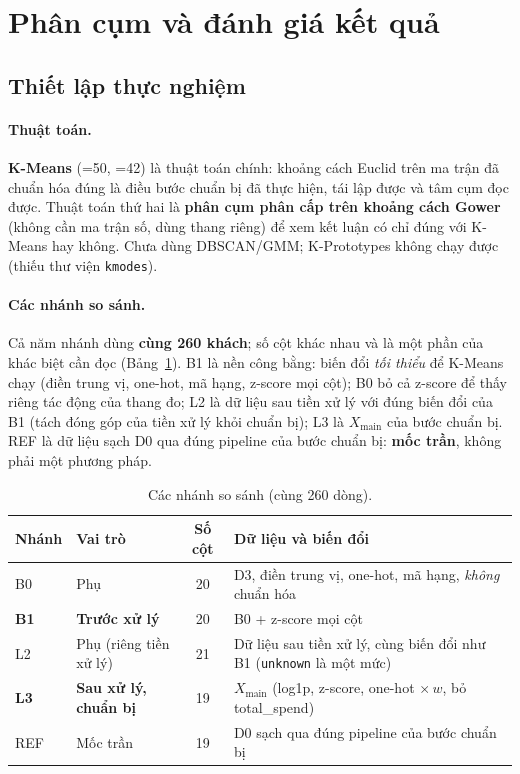 \section{Phân cụm và đánh giá kết quả}
\label{sec:e}

\subsection{Thiết lập thực nghiệm}
\paragraph{Thuật toán.} \textbf{K-Means} (=50, =42) là thuật toán chính: khoảng cách Euclid trên ma trận đã chuẩn hóa đúng là điều bước chuẩn bị đã thực hiện, tái lập được và tâm cụm đọc được.
Thuật toán thứ hai là \textbf{phân cụm phân cấp trên khoảng cách Gower} (không cần ma trận số, dùng thang riêng) để xem kết luận có chỉ đúng với K-Means hay không. Chưa dùng DBSCAN/GMM; K-Prototypes không chạy được (thiếu thư viện \texttt{kmodes}).

\paragraph{Các nhánh so sánh.} Cả năm nhánh dùng \textbf{cùng 260 khách}; số cột khác nhau và là một phần của khác biệt cần đọc (Bảng~\ref{tab:branches}). B1 là nền công bằng: biến đổi \emph{tối thiểu} để K-Means chạy
(điền trung vị, one-hot, mã hạng, z-score mọi cột); B0 bỏ cả z-score để thấy riêng tác động của thang đo; L2 là dữ liệu sau tiền xử lý với đúng biến đổi của B1 (tách đóng góp của tiền xử lý khỏi chuẩn bị); L3 là $X_{\text{main}}$ của bước chuẩn bị.
REF là dữ liệu sạch D0 qua đúng pipeline của bước chuẩn bị: \textbf{mốc trần}, không phải một phương pháp.

\begin{table}[htbp]
\centering\small
\caption{Các nhánh so sánh (cùng 260 dòng).}
\label{tab:branches}
\begin{tabularx}{\linewidth}{llcX}
\toprule
Nhánh & Vai trò & Số cột & Dữ liệu và biến đổi\\
\midrule
B0 & Phụ & 20 & D3, điền trung vị, one-hot, mã hạng, \emph{không} chuẩn hóa\\
\textbf{B1} & \textbf{Trước xử lý} & 20 & B0 + z-score mọi cột\\
L2 & Phụ (riêng tiền xử lý) & 21 & Dữ liệu sau tiền xử lý, cùng biến đổi như B1 (\texttt{unknown} là một mức)\\
\textbf{L3} & \textbf{Sau xử lý, chuẩn bị} & 19 & $X_{\text{main}}$ (log1p, z-score, one-hot $\times\,w$, bỏ total\_spend)\\
REF & Mốc trần & 19 & D0 sạch qua đúng pipeline của bước chuẩn bị\\
\bottomrule
\end{tabularx}
\end{table}

